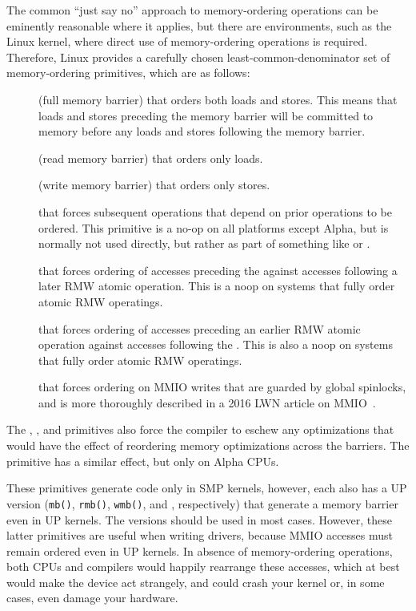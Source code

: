 The common ``just say no'' approach to memory-ordering operations
can be eminently reasonable where it applies,
but there are environments, such as the Linux kernel, where direct
use of memory-ordering operations is required.
Therefore,
Linux provides a carefully chosen least-common-denominator
set of memory-ordering primitives, which are as follows:
\begin{description}
\item	[] (full memory barrier) that orders both loads and
	stores.
	This means that loads and stores preceding the memory barrier
	will be committed to memory before any loads and stores
	following the memory barrier.
\item	[] (read memory barrier) that orders only loads.
\item	[] (write memory barrier) that orders only stores.
\item	[] that forces subsequent operations
	that depend on prior operations to be ordered.
	This primitive is a no-op on all platforms except Alpha, but
	is normally not used directly, but rather as part of
	something like  or
	.
\item	[] that forces ordering of accesses
	preceding the  against accesses following
	a later RMW atomic operation.
	This is a noop on systems that fully order atomic RMW operatings.
\item	[] that forces ordering of accesses
	preceding an earlier RMW atomic operation against accesses
	following the .
	This is also a noop on systems that fully order atomic RMW operatings.
\item	[] that forces ordering on MMIO writes that are guarded
	by global spinlocks, and is more thoroughly described
	in a 2016 LWN article on MMIO~\cite{PaulEMcKenney2016LinuxKernelMMIO}.
\end{description}
The , , and 
primitives also force
the compiler to eschew any optimizations that would have the effect
of reordering memory optimizations across the barriers.
The  primitive has a similar effect, but
only on Alpha CPUs.

These primitives generate code only in SMP kernels, however, each
also has a UP version ({\tt mb()}, {\tt rmb()}, {\tt wmb()},
and ,
respectively) that generate a memory barrier even in UP kernels. The 
versions should be used in most cases. However, these latter primitives
are useful when writing drivers, because MMIO accesses must remain
ordered even in UP kernels. In absence of memory-ordering operations,
both CPUs and compilers would happily rearrange these accesses, which at
best would make the device act strangely, and could crash your kernel or,
in some cases, even damage your hardware.

